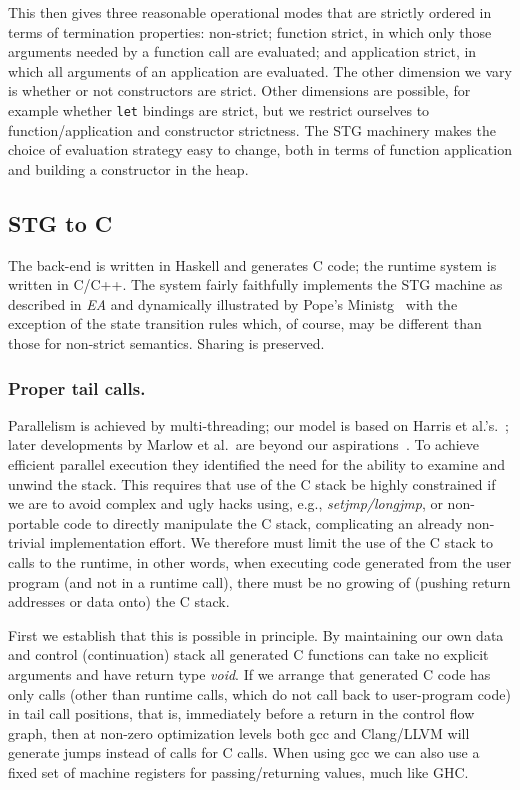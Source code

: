 \documentclass{llncs}
\begin{document}
This then gives three reasonable operational modes that are strictly ordered
in terms of termination properties: non-strict; function strict, in which only
those arguments needed by a function call are evaluated; and application
strict, in which all arguments of an application are evaluated.  The other
dimension we vary is whether or not constructors are strict.  Other dimensions
are possible, for example whether \texttt{let} bindings are strict, but we
restrict ourselves to function/application and constructor strictness.  The
STG machinery makes the choice of evaluation strategy easy to change, both in
terms of function application and building a constructor in the heap.

\subsection{STG to C}
The back-end is written in Haskell and generates C code;
the runtime system is written in C/C++.  The system fairly faithfully
implements the STG machine as described in \emph{EA} and dynamically
illustrated by Pope's Ministg~\cite{ministg} with the exception of the state
transition rules which, of course, may be different than those for non-strict
semantics.  Sharing is preserved.

\subsubsection{Proper tail calls.}
Parallelism is achieved by multi-threading; our model is based on Harris et
al.'s.~\cite{Harris:2005}; later developments by Marlow et al.\ are beyond our
aspirations~\cite{Marlow:2009,Marlow:2011}.  To achieve efficient parallel 
execution they identified the need for the ability to examine and unwind the 
stack.  This requires that use of the C stack be highly constrained if we are 
to avoid complex and ugly hacks using, e.g., \emph{setjmp/longjmp}, or
non-portable code to directly manipulate the C stack, complicating an
already non-trivial implementation effort.  We therefore must limit the
use of the C stack to calls to the runtime, in other words, when executing
code generated from the user program (and not in a runtime call), there
must be no growing of (pushing return addresses or data onto) the C stack.

First we establish that this is possible in principle.  By maintaining our own
data and control (continuation) stack all generated C functions can take no
explicit arguments and have return type \emph{void}. If we arrange that
generated C code has only calls (other than runtime calls, which do not call
back to user-program code) in tail call positions, that is, immediately before
a return in the control flow graph, then at non-zero optimization levels both
gcc and Clang/LLVM will generate jumps instead of calls for C calls.  When
using gcc we can also use a fixed set of machine registers for
passing/returning values, much like GHC.
\end{document}
